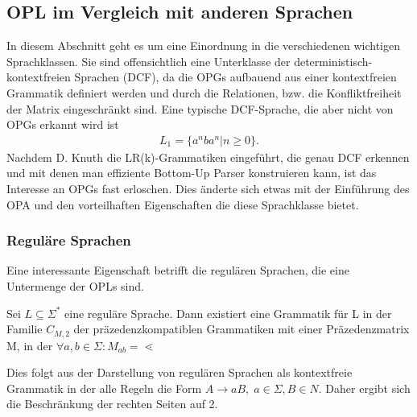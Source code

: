 \subsection{OPL im Vergleich mit anderen Sprachen}
In diesem Abschnitt geht es um eine Einordnung in die verschiedenen wichtigen Sprachklassen. Sie sind offensichtlich eine Unterklasse der deterministisch-kontextfreien Sprachen (DCF), da die OPGs aufbauend aus einer kontextfreien Grammatik definiert werden und durch die Relationen, bzw. die Konfliktfreiheit der Matrix eingeschränkt sind. Eine typische DCF-Sprache, die aber nicht von OPGs erkannt wird ist
\begin{align*}
L_1=\{a^nba^n|n \geq 0 \}.
\end{align*}
Nachdem D. Knuth die LR(k)-Grammatiken eingeführt, die genau DCF erkennen und mit denen man effiziente Bottom-Up Parser konstruieren kann, ist das Interesse an OPGs fast erloschen. Dies änderte sich etwas mit der Einführung des OPA und den vorteilhaften Eigenschaften die diese Sprachklasse bietet.
\subsubsection{Reguläre Sprachen}
Eine interessante Eigenschaft betrifft die regulären Sprachen, die eine Untermenge der OPLs sind.\cite{op_vpl_property}
\begin{lemma}
Sei $L\subseteq\Sigma^*$ eine reguläre Sprache. Dann existiert eine Grammatik für L in der Familie $C_{M,2}$ der präzedenzkompatiblen Grammatiken mit einer Präzedenzmatrix M, in der $\forall a,b\in \Sigma: M_{ab}=\lessdot$
\end{lemma}
Dies folgt aus der Darstellung von regulären Sprachen als kontextfreie Grammatik in der alle Regeln die Form $A\rightarrow aB, \; a \in \Sigma, B \in N$. Daher ergibt sich die Beschränkung der rechten Seiten auf 2.

